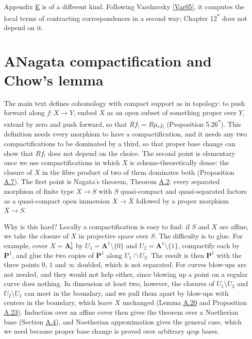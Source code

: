 \documentclass[11pt]{article}
\newcommand{\bpout}[1]{#1\textsuperscript{\hyperlink{bp-outside}{\ensuremath{\ast}}}}
\begin{document}
Appendix \hyperref[bp221]{E} is of a different kind. Following Varshavsky [\hyperref[bp347]{Var05}], it computes the local terms of contracting correspondences in a second way; Chapter \bpout{12} does not depend on it.

\section*{\texorpdfstring{A\quad Nagata compactification and Chow's lemma}{A Nagata compactification and Chow's lemma}}
\label{bp3}%
\label{bp4}%
The main text defines cohomology with compact support as in topology: to push forward along \(f:X\to Y\), embed \(X\) as an open subset of something proper over \(Y\), extend by zero and push forward, so that \(Rf_!=Rp_*j_!\) (Proposition \bpout{5.26}). This definition needs every morphism to have a compactification, and it needs any two compactifications to be dominated by a third, so that proper base change can show that \(Rf_!\) does not depend on the choice. The second point is elementary once we use compactifications in which \(X\) is scheme-theoretically dense: the closure of \(X\) in the fibre product of two of them dominates both (Proposition \hyperref[bp21]{A.7}). The first point is Nagata's theorem, Theorem \hyperref[bp9]{A.2}: every separated morphism of finite type \(X\to S\) with \(S\) quasi-compact and quasi-separated factors as a quasi-compact open immersion \(X\to\overline
X\) followed by a proper morphism \(\overline X\to S\).

Why is this hard? Locally a compactification is easy to find: if \(S\) and \(X\) are affine, we take the closure of \(X\) in projective space over \(S\). The difficulty is to glue. For example, cover \(X=\mathbf A^1_k\) by \(U_1=\mathbf A^1\setminus\{0\}\) and \(U_2=\mathbf A^1\setminus\{1\}\), compactify each by \(\mathbf P^1\), and glue the two copies of \(\mathbf
P^1\) along \(U_1\cap U_2\). The result is then \(\mathbf P^1\) with the three points \(0\), \(1\) and \(\infty\) doubled, which is not separated. For curves blow-ups are not needed, and they would not help either, since blowing up a point on a regular curve does nothing. In dimension at least two, however, the closures of \(U_1\setminus U_2\) and \(U_2\setminus U_1\) can meet in the boundary, and we pull them apart by blow-ups with centers in the boundary, which leave \(X\) unchanged (Lemma \hyperref[bp55]{A.20} and Proposition \hyperref[bp63]{A.23}). Induction over an affine cover then gives the theorem over a Noetherian base (Section \hyperref[bp65]{A.4}), and Noetherian approximation gives the general case, which we need because proper base change is proved over arbitrary qcqs bases.
\end{document}
